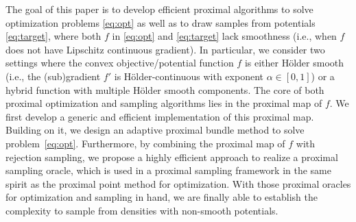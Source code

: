 \documentclass[11pt,letterpaper]{article}
\newcommand{\chen}{\color{cyan}}
\newcommand{\red}[1]{\textcolor{red}{#1}}
\begin{document}

The goal of this paper is to develop efficient proximal algorithms to solve optimization problems \eqref{eq:opt} as well as to draw samples from potentials \eqref{eq:target}, where both $f$ in \eqref{eq:opt} and \eqref{eq:target} lack smoothness (i.e., when $f$ does not have Lipschitz continuous gradient). 
In particular, we consider two settings where the convex objective/potential function $f$ is either Hölder smooth (i.e., the (sub)gradient $f'$ is H\"older-continuous with exponent $\alpha\in [0,1]$) or a hybrid function with multiple Hölder smooth components.
The core of both proximal optimization and sampling algorithms lies in the proximal map of $f$.
We first develop a generic and efficient implementation of this proximal map.
Building on it, we design an adaptive proximal bundle method to solve problem~\eqref{eq:opt}.
Furthermore, by combining the proximal map of $f$ with rejection sampling, we propose a highly efficient approach to realize a proximal sampling oracle, which is used in a proximal sampling framework \cite{lee2021structured,chen2022improved} in the same spirit as the proximal point method for optimization. With those proximal oracles for optimization and sampling in hand, we are finally able to establish the complexity to sample from densities with non-smooth potentials.
\end{document}
